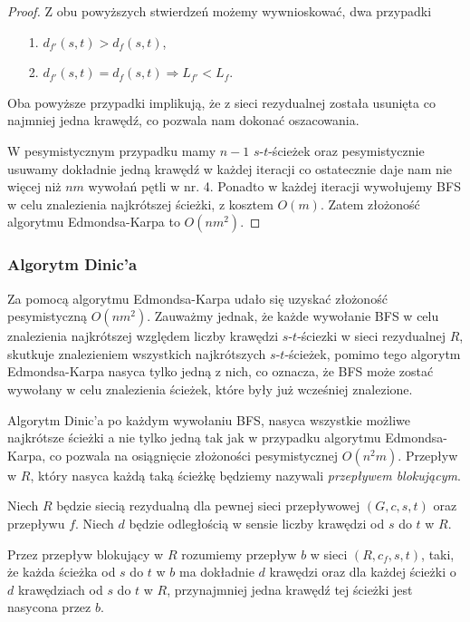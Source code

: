 \begin{theorem}
\begin{proof}
		Z obu powyższych stwierdzeń możemy wywnioskować, dwa przypadki
		\begin{itemize}
			\item[1.] $d_{f'}(s, t) > d_f(s, t)$,
			\item[2.] $d_{f'}(s, t) = d_f(s, t) \Rightarrow 
			L_{f'} < L_f$.
		\end{itemize}
		Oba powyższe przypadki implikują, że z sieci rezydualnej została 
		usunięta co najmniej jedna krawędź, co pozwala nam 
		dokonać oszacowania.
		
		W pesymistycznym przypadku mamy $n-1$ $s$-$t$-ścieżek oraz 
		pesymistycznie usuwamy dokładnie jedną krawędź w każdej iteracji
		co ostatecznie daje nam nie więcej niż $nm$ wywołań pętli w nr. 4.
		Ponadto w każdej iteracji wywołujemy BFS w celu znalezienia najkrótszej
		ścieżki, z kosztem $O(m)$. Zatem złożoność algorytmu Edmondsa-Karpa
		to $O(nm^2)$.
		
	\end{proof}
\end{theorem}

\subsubsection{Algorytm Dinic'a}
Za pomocą algorytmu Edmondsa-Karpa udało się uzyskać złożoność 
pesymistyczną $O(nm^2)$. Zauważmy jednak, że każde wywołanie 
BFS w celu znalezienia najkrótszej względem liczby krawędzi 
$s$-$t$-ściezki w sieci rezydualnej $R$, skutkuje znalezieniem 
wszystkich najkrótszych $s$-$t$-ścieżek, pomimo tego algorytm
Edmondsa-Karpa nasyca tylko jedną z nich, co oznacza, że
BFS może zostać wywołany w celu znalezienia ścieżek,
które były już wcześniej znalezione.

Algorytm Dinic'a po każdym wywołaniu BFS, nasyca wszystkie możliwe najkrótsze ścieżki a nie tylko jedną
tak jak w przypadku algorytmu Edmondsa-Karpa, co pozwala na 
osiągnięcie złożoności pesymistycznej $O(n^2m)$. Przepływ w $R$, który nasyca każdą taką ścieżkę
będziemy nazywali \textit{przepływem blokującym}.

\begin{defi}
	Niech $R$ będzie siecią rezydualną dla pewnej sieci przepływowej
	$(G, c, s, t)$ oraz przepływu $f$. Niech $d$ będzie odległością w sensie
	liczby krawędzi od $s$ do $t$ w $R$.
	
	Przez przepływ blokujący w $R$ rozumiemy przepływ $b$ w sieci
	$(R, c_f, s, t)$, taki, że każda ścieżka od $s$ do $t$ 
	w $b$ ma dokładnie $d$ krawędzi oraz dla każdej ścieżki o $d$ 
	krawędziach od $s$ do $t$ w $R$, przynajmniej jedna krawędź tej ścieżki
	jest nasycona przez $b$.
\end{defi}

